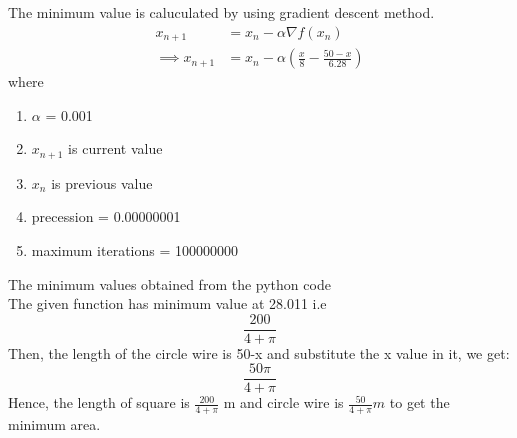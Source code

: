 \documentclass[journal,12pt,twocolumn]{IEEEtran}
\providecommand{\brak}[1]{\ensuremath{\left(#1\right)}}
\begin{document}
The minimum value is caluculated by using gradient descent method.
\begin{align}
        x_{n+1} &= x_n - \alpha \nabla f(x_n) \\
        \implies x_{n+1} &= x_n - \alpha\brak{\frac{x}{8}-\frac{50-x}{6.28}}
\end{align}
where \\
\begin{enumerate}
\item $\alpha$ = 0.001
\item $x_{n+1}$ is current value
\item $x_{n}$ is previous value
\item precession = 0.00000001
\item maximum iterations = 100000000
\end{enumerate}
The minimum values obtained from the python code \vspace{5mm}\\
The given function has minimum value at 28.011 i.e
\begin{equation}
\frac{200}{4+\pi}
\end{equation}
Then, the length of the circle wire is 50-x and substitute the x value in it, we get:
\begin{equation}
\frac{50\pi}{4+\pi}
\end{equation}
Hence, the length of square is $\frac{200}{4+\pi}$ m and circle wire is $\frac{50}{4+\pi}m$ to get the minimum area.
\end{document}
